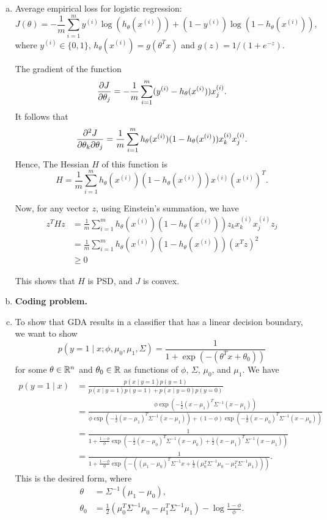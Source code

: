 \documentclass[12pt,letterpaper,boxed]{hmcpset}
\newcommand{\yy}{y^{(i)}}
\newcommand{\xx}{x^{(i)}}
\begin{document}
\begin{solution}

\begin{enumerate}[(a)]
  \item Average empirical loss for logistic regression:
  \[
  J(\theta) = -\frac{1}{m} \sum_{i=1}^m \yy \log(h_\theta (\xx)) + (1-\yy)
    \log(1-h_\theta(\xx)),
  \]
  where $\yy \in \{0,1\}$, $h_\theta(\xx) = g(\theta^T x)$ and $g(z) = 1/(1+e^{-z})$.
  
  The gradient of the function
  \[
  \pdv{J}{\theta_j} = - \frac{1}{m} \sum_{i=1}^m (\yy - h_\theta(\xx)) \xx_j.
  \]
  It follows that
  \[
  \pdv{J}{\theta_k}{\theta_j} = \frac{1}{m} \sum_{i=1}^m h_\theta(\xx) (1-h_\theta(\xx)) \xx_k \xx_j.
  \]
  Hence, The Hessian $H$ of this function is
  \[
  H = \frac{1}{m} \sum_{i=1}^m  h_\theta(\xx) (1-h_\theta(\xx)) \xx (\xx)^T.
  \]
  
  Now, for any vector $z$, using Einstein's summation, we have
  \[
  \begin{aligned}
  z^T H z &= \frac{1}{m} \sum_{i=1}^m h_\theta(\xx) (1-h_\theta(\xx)) z_k \xx_k \xx_j z_j \\
  &= 
  \frac{1}{m} \sum_{i=1}^m h_\theta(\xx) (1-h_\theta(\xx)) (x^T z)^2\\
  & \geq 0
  \end{aligned}
  \]
  
  This shows that $H$ is PSD, and $J$ is convex.
  
  \item \textbf{Coding problem.}

  \item 
  To show that GDA results in a classifier that has a linear decision boundary, we want to show 
  \[
  p(y = 1 \mid x; \phi, \mu_0, \mu_1, \Sigma) = \frac{1}{1 + \exp(-(\theta^T x + \theta_0))}
  \]
  for some $\theta \in \mathbb{R}^n$ and $\theta_0 \in \mathbb{R}$ as functions of $\phi$, $\Sigma$, $\mu_0$, and $\mu_1$.
  We have
  \[
  \begin{aligned}
      p(y = 1 \mid x) &= \frac{p(x \mid y=1) p(y=1)}{p(x \mid y=1) p(y=1) + p(x\mid y = 0) p(y = 0)} \\
      &= \frac{\phi \exp(-\frac{1}{2} (x-\mu_1)^T \Sigma^{-1} (x-\mu_1) )}{\phi \exp(-\frac{1}{2} (x-\mu_1)^T \Sigma^{-1} (x-\mu_1)) + (1-\phi) \exp(-\frac{1}{2} (x-\mu_0)^T \Sigma^{-1} (x-\mu_0))} \\
      &= \frac{1}{1 + \frac{1-\phi}{\phi} \exp(-\frac{1}{2} (x-\mu_0)^T \Sigma^{-1} (x-\mu_0) + \frac{1}{2} (x-\mu_1)^T \Sigma^{-1} (x-\mu_1))} \\
      &= \frac{1}{1 +\frac{1-\phi}{\phi} \exp(-((\mu_1 - \mu_0)^T \Sigma^{-1} x + \frac{1}{2} (\mu_0^T \Sigma^{-1} \mu_0 - \mu_1^T \Sigma^{-1} \mu_1)))}.
  \end{aligned}
  \]
  This is the desired form, where
  \[
  \begin{aligned}
      \theta &= \Sigma^{-1} (\mu_1 - \mu_0), \\
      \theta_0 &= \frac{1}{2} (\mu_0^T \Sigma^{-1} \mu_0 - \mu_1^T \Sigma^{-1} \mu_1) - \log \frac{1-\phi}{\phi}.
  \end{aligned}
  \]
  

\end{enumerate}
\end{solution}
\end{document}
